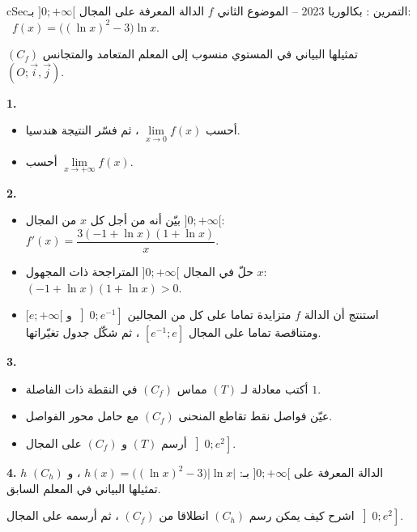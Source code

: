 \documentclass[12pt,a4paper]{article}
\newenvironment{BOX}[2]{\begin{otherlanguage}{english}\begin{arbox}{#1}{#2}}{\end{arbox}\end{otherlanguage}}
\newcounter{exo}
\newenvironment{tamrin}[1]{\stepcounter{exo}\begin{BOX}{cSec}{التمرين \theexo: #1}}{\end{BOX}}
\newenvironment{sq}{\begin{itemize}[leftmargin=2.4em,itemsep=3pt]}{\end{itemize}}
\newcommand{\qa}{\item[(أ)]}\newcommand{\qb}{\item[(ب)]}\newcommand{\qc}{\item[(جـ)]}\newcommand{\qd}{\item[(د)]}\newcommand{\qe}{\item[(هـ)]}
\newcommand{\QQ}[1]{\par\smallskip\textbf{#1.} }
\begin{document}
\begin{tamrin}{بكالوريا 2023 -- الموضوع الثاني}
$f$ الدالة المعرفة على المجال $]0;+\infty[$ بـ: \ $f(x)=\big((\ln x)^2-3\big)\ln x$.

$(C_f)$ تمثيلها البياني في المستوي منسوب إلى المعلم المتعامد والمتجانس $(O;\vec i,\vec j)$.
\QQ{1}
\begin{sq}
\qa أحسب $\lim\limits_{x\to0}f(x)$ ، ثم فسّر النتيجة هندسيا.
\qb أحسب $\lim\limits_{x\to+\infty}f(x)$.
\end{sq}
\QQ{2}
\begin{sq}
\qa بيّن أنه من أجل كل $x$ من المجال $]0;+\infty[$: \ $f'(x)=\dfrac{3(-1+\ln x)(1+\ln x)}{x}$.
\qb حلّ في المجال $]0;+\infty[$ المتراجحة ذات المجهول $x$: \ $(-1+\ln x)(1+\ln x)>0$.
\qc استنتج أن الدالة $f$ متزايدة تماما على كل من المجالين $\left]0;e^{-1}\right]$ و $[e;+\infty[$ ومتناقصة تماما على المجال $\left[e^{-1};e\right]$ ، ثم شكّل جدول تغيّراتها.
\end{sq}
\QQ{3}
\begin{sq}
\qa أكتب معادلة لـ $(T)$ مماس $(C_f)$ في النقطة ذات الفاصلة $1$.
\qb عيّن فواصل نقط تقاطع المنحنى $(C_f)$ مع حامل محور الفواصل.
\qc أرسم $(T)$ و $(C_f)$ على المجال $\left]0;e^2\right]$.
\end{sq}
\QQ{4} $h$ الدالة المعرفة على $]0;+\infty[$ بـ: $h(x)=\big((\ln x)^2-3\big)|\ln x|$ ، و $(C_h)$ تمثيلها البياني في المعلم السابق.

اشرح كيف يمكن رسم $(C_h)$ انطلاقا من $(C_f)$ ، ثم أرسمه على المجال $\left]0;e^2\right]$.
\end{tamrin}
\end{document}
